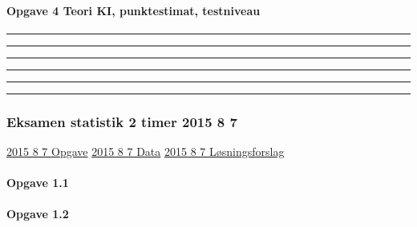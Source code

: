 \documentclass[]{book}
\let\oldparagraph\paragraph
\renewcommand{\paragraph}[1]{\oldparagraph{#1}\mbox{}}
\begin{document}
\hypertarget{opgave-4-teori-ki-punktestimat-testniveau}{%
\paragraph{Opgave 4 Teori KI, punktestimat, testniveau}\label{opgave-4-teori-ki-punktestimat-testniveau}}

\begin{center}\rule{0.5\linewidth}{\linethickness}\end{center}

\begin{center}\rule{0.5\linewidth}{\linethickness}\end{center}

\begin{center}\rule{0.5\linewidth}{\linethickness}\end{center}

\begin{center}\rule{0.5\linewidth}{\linethickness}\end{center}

\begin{center}\rule{0.5\linewidth}{\linethickness}\end{center}

\begin{center}\rule{0.5\linewidth}{\linethickness}\end{center}

\hypertarget{eksamen-statistik-2-timer-2015-8-7}{%
\subsubsection{Eksamen statistik 2 timer 2015 8 7}\label{eksamen-statistik-2-timer-2015-8-7}}

\href{https://www.dropbox.com/s/dwbpp3ykq17tbvb/2015\%208\%207\%201.reeksamen.pdf?dl=1}{2015 8 7 Opgave}
\href{https://www.dropbox.com/s/45d1xkhjp3c0owh/2015\%208\%207\%20Data.xlsx?dl=1}{2015 8 7 Data}
\href{https://www.dropbox.com/s/9nhbc21yth3si6o/2015\%208\%207\%20Freestat\%20skabelon\%20l\%C3\%B8sning.docx?dl=1}{2015 8 7 Løsningsforslag}

\hypertarget{opgave-1.1}{%
\paragraph{Opgave 1.1}\label{opgave-1.1}}

\hypertarget{opgave-1.2}{%
\paragraph{Opgave 1.2}\label{opgave-1.2}}
\end{document}
